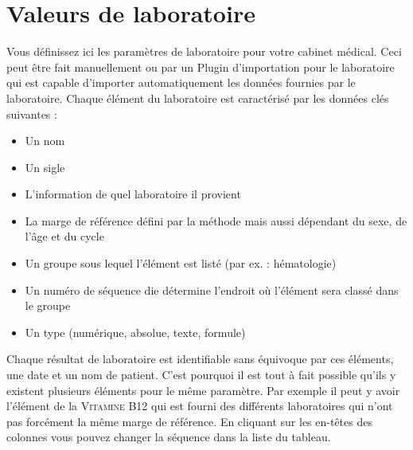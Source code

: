 \section{Valeurs de laboratoire}
\label{config:labor}
Vous définissez ici les paramètres de laboratoire pour votre cabinet médical. Ceci peut être fait manuellement ou par un Plugin d'importation pour le laboratoire qui est capable d'importer automatiquement les données fournies par le laboratoire. Chaque élément du laboratoire est caractérisé par les données clés suivantes :
\begin{itemize}
\item{Un nom}
\item{Un sigle}
\item{L'information de quel laboratoire il provient}
\item{La marge de référence défini par la méthode mais aussi dépendant du sexe, de l'âge et du cycle}
\item{Un groupe sous lequel l'élément est listé (par ex. : hématologie)}
\item{Un numéro de séquence die détermine l'endroit où l'élément sera classé dans le groupe}
\item{Un type (numérique, absolue, texte, formule)}
\end{itemize}

Chaque résultat de laboratoire est identifiable sans équivoque par ces éléments, une date et un nom de patient. C'est pourquoi il est tout à fait possible qu'ils y existent plusieurs éléments pour le même paramètre. Par exemple il peut y avoir l'élément de la \textsc{Vitamine B12} qui est fourni des différents laboratoires qui n'ont pas forcément la même marge de référence.
En cliquant sur les en-têtes des colonnes vous pouvez changer la séquence dans la liste du tableau.

